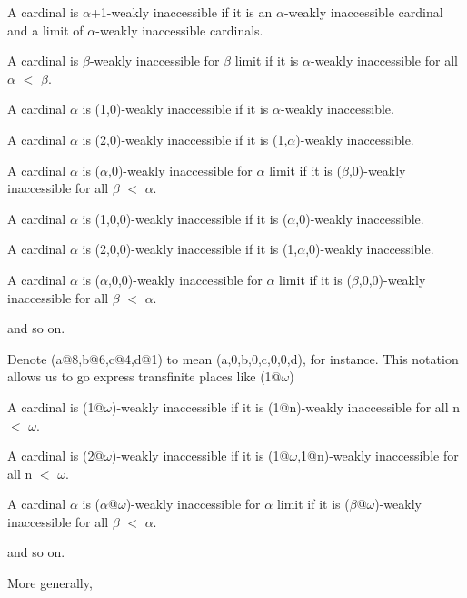 \documentclass[10pt]{article}
\begin{document}
\bigskip

A cardinal is \(\alpha\)+1-weakly inaccessible if it is an \(\alpha\)-weakly inaccessible cardinal and a limit of \(\alpha\)-weakly inaccessible cardinals.

A cardinal is \(\beta\)-weakly inaccessible for \(\beta\) limit if it is \(\alpha\)-weakly inaccessible for all \(\alpha\) \(<\) \(\beta\).

\bigskip

A cardinal \(\alpha\) is (1,0)-weakly inaccessible if it is \(\alpha\)-weakly inaccessible.

A cardinal \(\alpha\) is (2,0)-weakly inaccessible if it is (1,\(\alpha\))-weakly inaccessible.

A cardinal \(\alpha\) is (\(\alpha\),0)-weakly inaccessible for \(\alpha\) limit if it is (\(\beta\),0)-weakly inaccessible for all \(\beta\) \(<\) \(\alpha\).

\bigskip

A cardinal \(\alpha\) is (1,0,0)-weakly inaccessible if it is (\(\alpha\),0)-weakly inaccessible.

A cardinal \(\alpha\) is (2,0,0)-weakly inaccessible if it is (1,\(\alpha\),0)-weakly inaccessible.

A cardinal \(\alpha\) is (\(\alpha\),0,0)-weakly inaccessible for \(\alpha\) limit if it is (\(\beta\),0,0)-weakly inaccessible for all \(\beta\) \(<\) \(\alpha\).

and so on.

\bigskip

Denote (a@8,b@6,c@4,d@1) to mean (a,0,b,0,c,0,0,d), for instance. This notation allows us to go express transfinite places like (1@\(\omega\))

\bigskip

A cardinal is (1@\(\omega\))-weakly inaccessible if it is (1@n)-weakly inaccessible for all n \(<\) \(\omega\).

A cardinal is (2@\(\omega\))-weakly inaccessible if it is (1@\(\omega\),1@n)-weakly inaccessible for all n \(<\) \(\omega\).

A cardinal \(\alpha\) is (\(\alpha\)@\(\omega\))-weakly inaccessible for \(\alpha\) limit if it is (\(\beta\)@\(\omega\))-weakly inaccessible for all \(\beta\) \(<\) \(\alpha\).

\bigskip

and so on.

\bigskip

More generally, 

\bigskip
\end{document}
